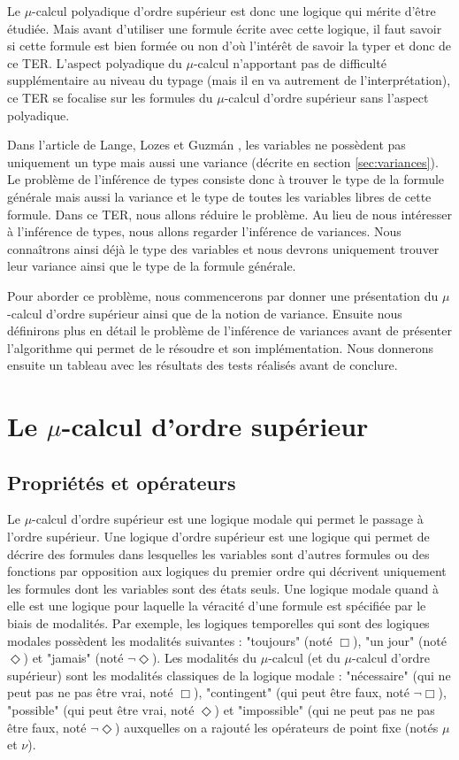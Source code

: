 \documentclass{rapport}
\theoremstyle{plain}
\theoremstyle{remark}
\theoremstyle{definition}
\begin{document}
Le $\mu$-calcul polyadique d'ordre supérieur est donc une logique qui mérite d'être étudiée. Mais avant d'utiliser une formule écrite avec cette logique, il faut savoir si cette formule est bien formée ou non d'où l'intérêt de savoir la typer et donc de ce TER. L'aspect polyadique du $\mu$-calcul n'apportant pas de difficulté supplémentaire au niveau du typage (mais il en va autrement de l'interprétation), ce TER se focalise sur les formules du $\mu$-calcul d'ordre supérieur sans l'aspect polyadique. 

Dans l'article de Lange, Lozes et Guzm{\'a}n \citep{lange2014model}, les variables ne possèdent pas uniquement un type mais aussi une variance (décrite en section \ref{sec:variances}). Le problème de l'inférence de types consiste donc à trouver le type de la formule générale mais aussi la variance et le type de toutes les variables libres de cette formule. Dans ce TER, nous allons réduire le problème. Au lieu de nous intéresser à l'inférence de types, nous allons regarder l'inférence de variances. Nous connaîtrons ainsi déjà le type des variables et nous devrons uniquement trouver leur variance ainsi que le type de la formule générale.  

Pour aborder ce problème, nous commencerons par donner une présentation du $\mu$-calcul d'ordre supérieur ainsi que de la notion de variance. Ensuite nous définirons plus en détail le problème de l'inférence de variances avant de présenter l'algorithme qui permet de le résoudre et son implémentation. Nous donnerons ensuite un tableau avec les résultats des tests réalisés avant de conclure.   

\section{Le $\mu$-calcul d'ordre supérieur\label{sec:muCalcul}}

\subsection{Propriétés et opérateurs\label{sec:prop&op}}

Le $\mu$-calcul d'ordre supérieur est une logique modale qui permet le passage à l'ordre supérieur. Une logique d'ordre supérieur est une logique qui permet de décrire des formules dans lesquelles les variables sont d'autres formules ou des fonctions par opposition aux logiques du premier ordre qui décrivent uniquement les formules dont les variables sont des états seuls. Une logique modale quand à elle est une logique pour laquelle la véracité d'une formule est spécifiée par le biais de modalités. Par exemple, les logiques temporelles qui sont des logiques modales possèdent les modalités suivantes : "toujours" (noté $\Box$), "un jour" (noté $\Diamond$) et "jamais" (noté $\neg \Diamond$). Les modalités du $\mu$-calcul (et du $\mu$-calcul d'ordre supérieur) sont les modalités classiques de la logique modale : "nécessaire" (qui ne peut pas ne pas être vrai, noté $\Box$), "contingent" (qui peut être faux, noté $\neg \Box$), "possible" (qui peut être vrai, noté $\Diamond$) et "impossible" (qui ne peut pas ne pas être faux, noté $\neg \Diamond$) auxquelles on a rajouté les opérateurs de point fixe (notés $\mu$ et $\nu$).
\end{document}
